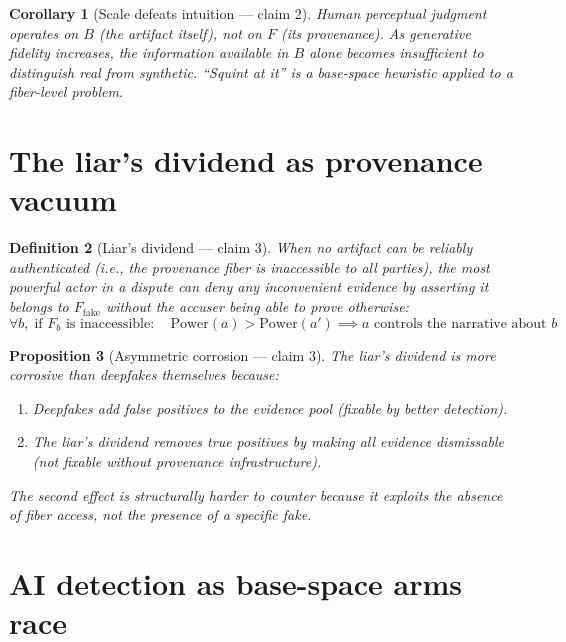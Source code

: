 \documentclass[11pt,a4paper]{article}
\newtheorem{definition}{Definition}[section]
\newtheorem{proposition}[definition]{Proposition}
\newtheorem{corollary}[definition]{Corollary}
\begin{document}
\begin{corollary}[Scale defeats intuition --- claim 2]
Human perceptual judgment operates on $B$ (the artifact itself), not on
$F$ (its provenance). As generative fidelity increases, the information
available in $B$ alone becomes insufficient to distinguish real from
synthetic. ``Squint at it'' is a base-space heuristic applied to a
fiber-level problem.
\end{corollary}

\section{The liar's dividend as provenance vacuum}
\label{sec:liar}

\begin{definition}[Liar's dividend --- claim 3]
\label{def:liar}
When no artifact can be reliably authenticated (i.e., the provenance
fiber is inaccessible to all parties), the most powerful actor in a
dispute can deny any inconvenient evidence by asserting it belongs to
$F_{\text{fake}}$ without the accuser being able to prove otherwise:
\[
  \forall b,\; \text{if } F_b \text{ is inaccessible}: \quad
  \text{Power}(a) > \text{Power}(a') \implies
  a \text{ controls the narrative about } b
\]
\end{definition}

\begin{proposition}[Asymmetric corrosion --- claim 3]
\label{prop:corrosion}
The liar's dividend is more corrosive than deepfakes themselves because:
\begin{enumerate}
\item Deepfakes add false positives to the evidence pool (fixable by
  better detection).
\item The liar's dividend removes true positives by making all evidence
  dismissable (not fixable without provenance infrastructure).
\end{enumerate}
The second effect is structurally harder to counter because it exploits
the \emph{absence} of fiber access, not the presence of a specific fake.
\end{proposition}

\section{AI detection as base-space arms race}
\label{sec:detection}
\end{document}
